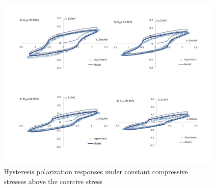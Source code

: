 \begin{figure} 
\centering 
\includegraphics[width=6.0in]{./chap_2_pol_sw/figures/Fig_6_hysteresis_polarization_responses_under_constant_compressive_stresses_above_the_coercive_stress.pdf} 
\caption{Hysteresis polarization responses under constant compressive stresses above the coercive stress}
\label{Fig_6_hysteresis_polarization_responses_under_constant_compressive_stresses_above_the_coercive_stress}
\end{figure} 

